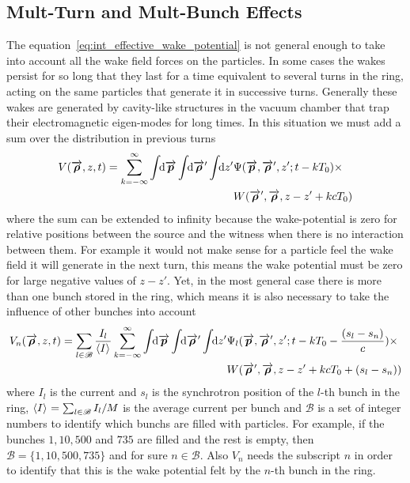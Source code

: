 \subsection{Mult-Turn and Mult-Bunch Effects}

    The equation~\eqref{eq:int_effective_wake_potential} is not general enough to take into account all the wake field forces on the particles. In some cases the wakes persist for so long that they last for a time equivalent to several turns in the ring, acting on the same particles that generate it in successive turns. Generally these wakes are generated by cavity-like structures in the vacuum chamber that trap their electromagnetic eigen-modes for long times. In this situation we must add a sum over the distribution in previous turns
    \begin{align}\nonumber
  	  	V(\overrightarrow{\boldsymbol{\rho}}, z, t) = \sum_{k=-\infty}^\infty\int\!\!\text{d}\overrightarrow{\boldsymbol{p}} \int\!\!\text{d}\overrightarrow{\boldsymbol{\rho}}' \int\!\!\text{d}z' 
	  			&\Psi(\overrightarrow{\boldsymbol{p}},\overrightarrow{\boldsymbol{\rho}}',z'; t-kT_0)\times\\ &W(\overrightarrow{\boldsymbol{\rho}}',\overrightarrow{\boldsymbol{\rho}},z-z' + kcT_0)
    \end{align}
    where the sum can be extended to infinity because the wake-potential is zero for relative positions between the source and the witness when there is no interaction between them. For example it would not make sense for a particle feel the wake field it will generate in the next turn, this means the wake potential must be zero for large negative values of $z-z'$. Yet, in the most general case there is more than one bunch stored in the ring, which means it is also necessary to take the influence of other bunches into account
    \begin{align}\label{eq:general_eff_wake_pot}\nonumber
  	  	V_n(\overrightarrow{\boldsymbol{\rho}}, z, t) = \sum_{l\in\mathscr{B}}\frac{I_l}{\left\langle I \right\rangle_{{}}}\sum_{k=-\infty}^\infty\int\!\!\text{d}\overrightarrow{\boldsymbol{p}} \int\!\!\text{d}\overrightarrow{\boldsymbol{\rho}}' \int\!\!\text{d}z' 
	  			&\Psi_l(\overrightarrow{\boldsymbol{p}},\overrightarrow{\boldsymbol{\rho}}',z'; t-kT_0-\frac{(s_l-s_n)}{c})
				\times\\
				&W(\overrightarrow{\boldsymbol{\rho}}',\overrightarrow{\boldsymbol{\rho}},z-z' + kcT_0 + (s_l-s_n))
    \end{align}
    where $I_l$ is the current and $s_l$ is the synchrotron position of the $l$-th bunch in the ring, $\left\langle I \right\rangle_{{}}=\sum_{l\in\mathscr{B}}I_l/M$ is the average current per bunch and $\mathscr{B}$ is a set of integer numbers to identify which bunchs are filled with particles. For example, if the bunches $1, 10, 500$ and $735$ are filled and the rest is empty, then $\mathscr{B} = \{ 1, 10, 500, 735 \}$ and for sure $n\in\mathscr{B}$. Also $V_n$ needs the subscript $n$ in order to identify that this is the wake potential felt by the $n$-th bunch in the ring.

